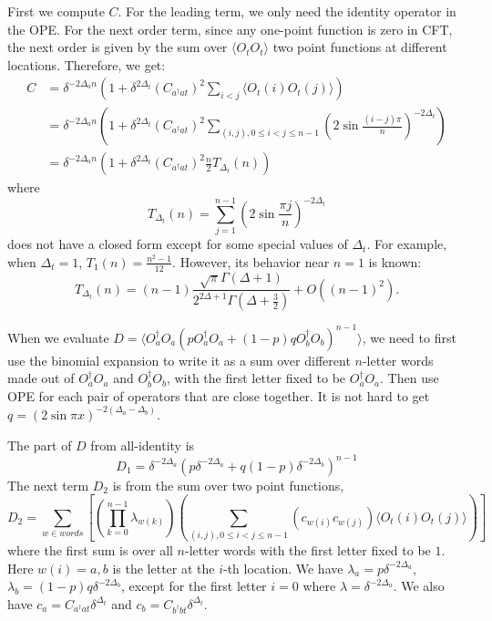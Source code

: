 \documentclass{article}
\theoremstyle{plain}
\theoremstyle{definition}
\theoremstyle{plain}
\def\la{\langle}
\def\ra{\rangle}
\begin{document}
First we compute $C$. For the leading term, we only need the identity operator in the OPE. For the next order term, since any one-point function is zero in CFT, the next order is given by the sum over $\la O_t O_t \ra$ two point functions at different locations. Therefore, we get:
\begin{equation}
\begin{aligned}
    C&=\delta^{-2\Delta_a n} \left(1+ \delta^{2\Delta_t}(C_{a^\dagger at})^2\sum_{i<j} \la O_t(i) O_t(j)\ra\right)\\
    & = \delta^{-2\Delta_a n} \left(1+ \delta^{2\Delta_t}(C_{a^\dagger at})^2\sum_{(i,j),0\leq i<j\leq n-1} (2\sin\frac{(i-j)\pi}{n})^{-2\Delta_t}\right)\\
    & = \delta^{-2\Delta_a n} \left(1+ \delta^{2\Delta_t}(C_{a^\dagger at})^2\frac{n}{2}T_{\Delta_t}(n)\right)
\end{aligned}
\end{equation}
where 
\begin{equation}
    T_{\Delta_t}(n) = \sum_{j=1}^{n-1} (2\sin\frac{\pi j}{n})^{-2\Delta_t}
\end{equation}
does not have a closed form except for some special values of $\Delta_t$. For example, when $\Delta_t=1$, $T_1(n)=\frac{n^2-1}{12}$. However, its behavior near $n=1$ is known:
\begin{equation}
    T_{\Delta_t}(n)=(n-1) \frac{\sqrt{\pi} \Gamma(\Delta+1)}{2^{2 \Delta+1} \Gamma\left(\Delta+\frac{3}{2}\right)}+O((n-1)^2).
\end{equation}

When we evaluate $D=\la O_a^\dagger O_{a} (p O_a^\dagger O_{a} +(1-p)q O_b^\dagger O_{b})^{n-1} \ra$, we need to first use the binomial expansion to write it as a sum over different $n$-letter words made out of $O_a^\dagger O_a$ and $O_b^\dagger O_b$, with the first letter fixed to be $O_a^\dagger O_a$. Then use OPE for each pair of operators that are close together. It is not hard to get $q=(2\sin \pi x)^{-2(\Delta_a-\Delta_b)}$. 

The part of $D$ from all-identity is 
\begin{equation}
D_1=\delta^{-2\Delta_a} (p \delta^{-2\Delta_a} + q(1-p) \delta^{-2\Delta_b} )^{n-1} 
\end{equation}
The next term $D_2$ is from the sum over two point functions,
\begin{equation}
    D_2= \sum_{w\in words} \left[\left( \prod_{k=0}^{n-1} \lambda_{w(k)} \right) \left( \sum_{(i,j),0\leq i<j
    \leq n-1} (c_{w(i)} c_{w(j)} ) \la O_t(i) O_t(j) \ra\right)\right]
\end{equation}
where the first sum is over all $n$-letter words with the first letter fixed to be $1$. Here $w(i)=a,b$ is the letter at the $i$-th location. We have $\lambda_a=p \delta^{-2\Delta_a}$, $\lambda_b=(1-p)q \delta^{-2\Delta_b}$, except for the first letter $i=0$ where $\lambda=\delta^{-2\Delta_a}$. We also have $c_a=C_{a^\dagger a t} \delta^{\Delta_t}$ and $c_b=C_{b^\dagger bt} \delta^{\Delta_t}$.
\end{document}
